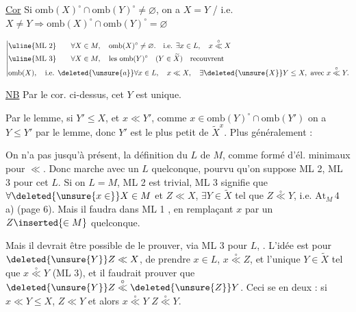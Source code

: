 
\uline{Cor} Si $\mathrm{omb}(X)^\circ\cap\mathrm{omb}(Y)^\circ\neq\varnothing$, on a $X=Y$ / i.e. $X\neq Y\Rightarrow\mathrm{omb}(X)^\circ\cap\mathrm{omb}(Y)^\circ=\varnothing$

\[
\left|\begin{aligned}
&\uline{\text{ML 2}}\qquad \forall X\in M,\quad \mathrm{omb}(X)^\circ\neq\varnothing.\quad \text{i.e. }\exists x\in L,\quad x\overset{\circ}{\ll}X\\
&\uline{\text{ML 3}}\qquad \forall X\in M,\quad \text{les }\mathrm{omb}(Y)^\circ\quad(Y\in\widetilde X)\quad\text{recouvrent}\\
&\mathrm{omb}(X),\quad\text{i.e. }\deleted{\unsure{a}}\forall x\in L,\quad x\ll X,\quad\exists\deleted{\unsure{X}}Y\leq X,\ \text{avec }x\overset{\circ}{\ll}Y.
\end{aligned}\right.
\]


\uline{NB} Par le cor. ci-dessus, cet $Y$ est unique.

Par le lemme, si  $Y'\leq X$, et $x\ll Y'$, comme $x\in\mathrm{omb}(Y)^\circ\cap\mathrm{omb}(Y')$  on a $Y\leq Y'$ par le lemme, donc $Y'$ est le plus petit  de $\widetilde X^x$. Plus généralement :


On n'a pas jusqu'à présent,  la définition du  $L$ de $M$, comme formé d'él. minimaux pour $\ll$. Donc  marche avec un $L$ quelconque, pourvu qu'on suppose ML 2, ML 3 pour cet $L$. Si on  $L=M$, ML 2 est trivial, ML 3 signifie que $\forall\deleted{\unsure{x\in}}X\in M$ et $Z\ll X$, $\exists Y\in\widetilde X$ tel que $Z\overset{\circ}{\ll}Y$, i.e. $\mathrm{At}_{M}\,4$ a) (page 6). Mais il faudra dans ML 1  , en remplaçant $x$ par un $Z\inserted{\in M}$ quelconque.

Mais il devrait être possible de le prouver, via ML 3  pour $L$, . L'idée est pour $\deleted{\unsure{Y}}Z\ll X$, de prendre $x\in L$, $x\overset{\circ}{\ll}Z$,  et l'unique $Y\in\widetilde X$ tel que $x\overset{\circ}{\ll}Y$ (ML 3), et il  faudrait prouver que $\deleted{\unsure{Y}}Z\overset{\circ}{\ll}\deleted{\unsure{Z}}Y$. Ceci se  en deux : si $x\ll Y\leq X$,  $Z\ll Y$ et alors $x\overset{\circ}{\ll}Y$  $Z\overset{\circ}{\ll}Y$.

